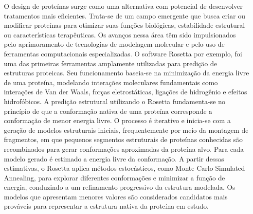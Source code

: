 O design de proteínas surge como uma alternativa com potencial de desenvolver tratamentos mais eficientes. 
Trata-se de um campo emergente que busca criar ou modificar proteínas para otimizar suas funções biológicas, 
estabilidade estrutural ou características terapêuticas. 
Os avanços nessa área têm sido impulsionados pelo aprimoramento de tecnologias de modelagem molecular
e pelo uso de ferramentas computacionais especializadas.
O software Rosetta \cite{Rosetta} por exemplo,
foi uma das primeiras ferramentas amplamente utilizadas para predição de estruturas proteicas.
Seu funcionamento baseia-se na minimização da energia livre de uma proteína, 
modelando interações moleculares fundamentais como interações de Van der Waals,
forças eletrostáticas, ligações de hidrogênio e efeitos hidrofóbicos.
A predição estrutural utilizando o Rosetta fundamenta-se no princípio de que a conformação nativa de uma proteína 
corresponde a conformação de menor energia livre. 
O processo é iterativo e inicia-se com a geração de modelos estruturais iniciais, 
frequentemente por meio da montagem de fragmentos, 
em que pequenos segmentos estruturais de proteínas conhecidas são recombinados para gerar conformações aproximadas da proteína alvo.
Para cada modelo gerado é estimado a energia livre da conformação.
A partir dessas estimativas, o Rosetta aplica métodos estocásticos, 
como Monte Carlo Simulated Annealing, para explorar diferentes conformações e minimizar a função de energia,
conduzindo a um refinamento progressivo da estrutura modelada. 
Os modelos que apresentam menores valores são considerados candidatos mais prováveis para representar a estrutura nativa
da proteína em estudo.


